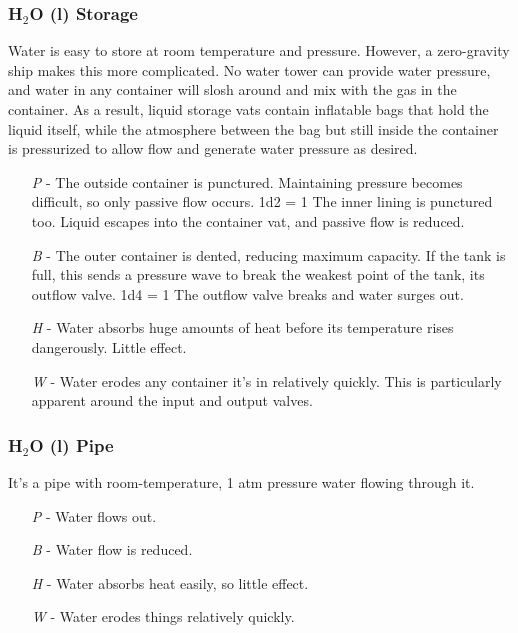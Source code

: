 \documentclass[a4paper]{article}
\begin{document}
\vspace{-0.5cm} \hspace{-18pt} \subsubsection{H$_2$O (l) Storage} \label{engine_h2o_storage} \vspace{-0.2cm} 
Water is easy to store at room temperature and pressure. However, a zero-gravity ship makes this more complicated. No water tower can provide water pressure, and water in any container will slosh around and mix with the gas in the container. As a result, liquid storage vats contain inflatable bags that hold the liquid itself, while the atmosphere between the bag but still inside the container is pressurized to allow flow and generate water pressure as desired.
\begin{enumerate}
\item [\textit{P}] - The outside container is punctured. Maintaining pressure becomes difficult, so only passive flow occurs. \newline \vspace{-3pt} 1d2 = 1 The inner lining is punctured too. Liquid escapes into the container vat, and passive flow is reduced.
\item [\textit{B}] - The outer container is dented, reducing maximum capacity. If the tank is full, this sends a pressure wave to break the weakest point of the tank, its outflow valve. 1d4 = 1 The outflow valve breaks and water surges out.
\item [\textit{H}] - Water absorbs huge amounts of heat before its temperature rises dangerously. Little effect.
\item [\textit{W}] - Water erodes any container it's in relatively quickly. This is particularly apparent around the input and output valves.
\end{enumerate}

\vspace{-0.5cm} \hspace{-18pt} \subsubsection{H$_2$O (l) Pipe} \label{engine_h2o_pipe} \vspace{-0.2cm}
It's a pipe with room-temperature, 1 atm pressure water flowing through it. 
\begin{enumerate}
\item [\textit{P}] - Water flows out.
\item [\textit{B}] - Water flow is reduced.
\item [\textit{H}] - Water absorbs heat easily, so little effect.
\item [\textit{W}] - Water erodes things relatively quickly.
\end{enumerate}
\end{document}
